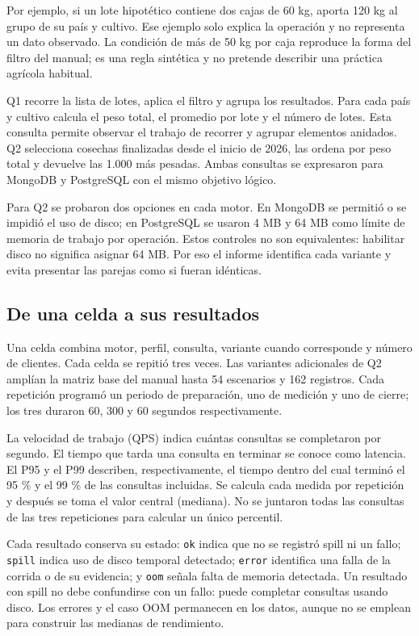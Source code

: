 \documentclass[12pt,letterpaper]{article}
\begin{document}
Por ejemplo, si un lote hipotético contiene dos cajas de 60 kg, aporta 120 kg al grupo de su país y cultivo. Ese ejemplo solo explica la operación y no representa un dato observado. La condición de más de 50 kg por caja reproduce la forma del filtro del manual; es una regla sintética y no pretende describir una práctica agrícola habitual.

Q1 recorre la lista de lotes, aplica el filtro y agrupa los resultados. Para cada país y cultivo calcula el peso total, el promedio por lote y el número de lotes. Esta consulta permite observar el trabajo de recorrer y agrupar elementos anidados. Q2 selecciona cosechas finalizadas desde el inicio de 2026, las ordena por peso total y devuelve las 1.000 más pesadas. Ambas consultas se expresaron para MongoDB y PostgreSQL con el mismo objetivo lógico.

Para Q2 se probaron dos opciones en cada motor. En MongoDB se permitió o se impidió el uso de disco; en PostgreSQL se usaron 4 MB y 64 MB como límite de memoria de trabajo por operación. Estos controles no son equivalentes: habilitar disco no significa asignar 64 MB. Por eso el informe identifica cada variante y evita presentar las parejas como si fueran idénticas.

\subsection*{De una celda a sus resultados}
Una celda combina motor, perfil, consulta, variante cuando corresponde y número de clientes. Cada celda se repitió tres veces. Las variantes adicionales de Q2 amplían la matriz base del manual hasta 54 escenarios y 162 registros. Cada repetición programó un periodo de preparación, uno de medición y uno de cierre; los tres duraron 60, 300 y 60 segundos respectivamente.

La velocidad de trabajo (QPS) indica cuántas consultas se completaron por segundo. El tiempo que tarda una consulta en terminar se conoce como latencia. El P95 y el P99 describen, respectivamente, el tiempo dentro del cual terminó el 95 \% y el 99 \% de las consultas incluidas. Se calcula cada medida por repetición y después se toma el valor central (mediana). No se juntaron todas las consultas de las tres repeticiones para calcular un único percentil.

Cada resultado conserva su estado: \texttt{ok} indica que no se registró spill ni un fallo; \texttt{spill} indica uso de disco temporal detectado; \texttt{error} identifica una falla de la corrida o de su evidencia; y \texttt{oom} señala falta de memoria detectada. Un resultado con spill no debe confundirse con un fallo: puede completar consultas usando disco. Los errores y el caso OOM permanecen en los datos, aunque no se emplean para construir las medianas de rendimiento.
\end{document}
